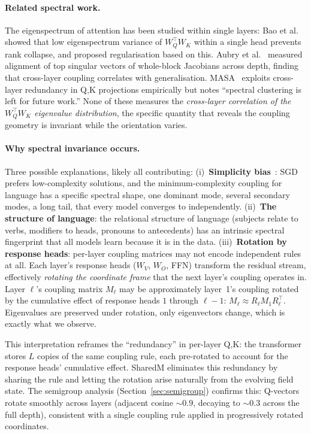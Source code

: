 \documentclass[11pt, a4paper]{article}
\theoremstyle{remark}
\begin{document}
\begin{enumerate}[nosep]
    \paragraph{Related spectral work.}
    The eigenspectrum of attention has been studied within single layers: Bao et al.~\cite{bao2024qk} showed that low eigenspectrum variance of $W_Q^\top W_K$ within a single head prevents rank collapse, and proposed regularisation based on this.
    Aubry et al.~\cite{aubry2024block} measured alignment of top singular vectors of whole-block Jacobians across depth, finding that cross-layer coupling correlates with generalisation.
    MASA~\cite{masa2025} exploits cross-layer redundancy in Q,K projections empirically but notes ``spectral clustering is left for future work.''
    None of these measures the \emph{cross-layer correlation of the $W_Q^\top W_K$ eigenvalue distribution}, the specific quantity that reveals the coupling geometry is invariant while the orientation varies.

    \paragraph{Why spectral invariance occurs.}
    Three possible explanations, likely all contributing:
    (i)~\textbf{Simplicity bias}~\cite{louis2025occam}: SGD prefers low-complexity solutions, and the minimum-complexity coupling for language has a specific spectral shape, one dominant mode, several secondary modes, a long tail, that every model converges to independently.
    (ii)~\textbf{The structure of language}: the relational structure of language (subjects relate to verbs, modifiers to heads, pronouns to antecedents) has an intrinsic spectral fingerprint that all models learn because it is in the data.
    (iii)~\textbf{Rotation by response heads}: per-layer coupling matrices may not encode independent rules at all.
    Each layer's response heads ($W_V$, $W_O$, FFN) transform the residual stream, effectively \emph{rotating the coordinate frame} that the next layer's coupling operates in.
    Layer $\ell$'s coupling matrix $M_\ell$ may be approximately layer~1's coupling rotated by the cumulative effect of response heads $1$ through $\ell{-}1$: $M_\ell \approx R_\ell M_1 R_\ell^\top$.
    Eigenvalues are preserved under rotation, only eigenvectors change, which is exactly what we observe.

    This interpretation reframes the ``redundancy'' in per-layer Q,K: the transformer stores $L$ copies of the same coupling rule, each pre-rotated to account for the response heads' cumulative effect.
    SharedM eliminates this redundancy by sharing the rule and letting the rotation arise naturally from the evolving field state.
    The semigroup analysis (Section~\ref{sec:semigroup}) confirms this: Q-vectors rotate smoothly across layers (adjacent cosine ${\sim}0.9$, decaying to ${\sim}0.3$ across the full depth), consistent with a single coupling rule applied in progressively rotated coordinates.


\end{enumerate}
\end{document}
